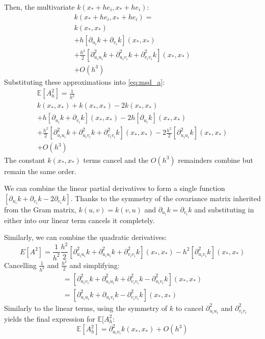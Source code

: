 Then, the multivariate $k(x_* + h e_i, x_* + h e_i)$:
\begin{equation*}
    \begin{aligned}
        k(x_* + h e_i, x_* + h e_i) = \\
        k(x_*, x_*) \\
        + h [\partial_{u_i}k + \partial_{v_i}k](x_*, x_*) \\
        + \frac{h^2}{2} [\partial_{u_i u_i}^2 k + \partial_{u_i v_i}^2 k + \partial_{v_i v_i}^2 k](x_*, x_*) \\
        + O(h^3) 
    \end{aligned}
\end{equation*}
Substituting these approximations into \ref{eq:msd_a}:
\begin{equation*}
    \begin{aligned}
        \mathbb{E}[A^2_h] = \frac{1}{h^2} \\
        k(x_*, x_*) + k(x_*, x_*) - 2k(x_*, x_*) \\
        + h [\partial_{u_i}k + \partial_{v_i}k](x_*, x_*) - 2h[\partial_{u_i}k](x_*, x_*) \\
        + \frac{h^2}{2} [\partial_{u_i u_i}^2 k + \partial_{u_i v_i}^2 k + \partial_{v_i v_i}^2 k](x_*, x_*) - 2\frac{h^2}{2} [\partial_{u_i u_i}^2k](x_*, x_*) \\
        + O(h^3)
    \end{aligned}
\end{equation*}
The constant $k(x_*, x_*)$ terms cancel and the $O(h^3)$ remainders combine but remain the same order. 

We can combine the linear partial derivatives to form a single function $[\partial_{u_i}k + \partial_{v_i}k - 2\partial_{v_i}k]$. Thanks to the symmetry of the covariance matrix inherited from the Gram matrix, $k(u,v) = k(v,u)$ and $\partial_{u_i}k = \partial_{v_i}k$ and substituting in either into our linear term cancels it completely. 

Similarly, we can combine the quadratic derivatives:
\begin{equation*}
    E[A^2] = \frac{1}{h^2} \frac{h^2}{2}[\partial_{u_i u_i}^2 k + \partial_{u_i u_i}^2 k + \partial_{v_i v_i}^2k](x_*,x_*) - h^2[\partial_{u_i v_i}^2 k](x_*, x_*)
\end{equation*}
Cancelling $\frac{1}{h^2}$ and $\frac{h^2}{2}$ and simplifying:
\begin{equation*}
    \begin{aligned}
    = [\partial_{u_i v_i}^2 k + \partial_{u_i u_i}^2 k + \partial_{v_i v_i}^2k - \partial_{u_i v_i}^2 k](x_*, x_*) \\
    = [\partial_{u_i u_i}^2 k + \partial_{u_i v_i}k - \partial_{v_i v_i}^2 k](x_*, x_*)
    \end{aligned}
\end{equation*}
Similarly to the linear terms, using the symmetry of $k$ to cancel $\partial_{u_i u_i}^2$ and $\partial_{v_i v_i}^2$ yields the final expression for $\mathbb{E}[A_h^2$:
\begin{equation} \label{eq:msd_a_final}
    \mathbb{E}[A_h^2] = \partial_{u_i v_i}^2 k(x_*,x_*) + O(h^3) 
\end{equation}


